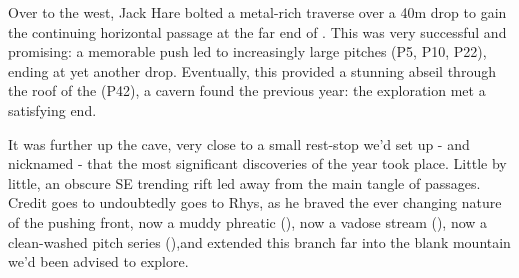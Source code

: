 Over to the west, Jack Hare bolted a metal-rich traverse over a 40m drop to gain the continuing horizontal passage at the far end of . This was very successful and promising: a memorable push led to increasingly large pitches (P5, P10, P22), ending at yet another drop. Eventually, this provided a stunning abseil through the roof of the  (P42), a cavern found the previous year: the exploration met a satisfying end.

It was further up the cave, very close to a small rest-stop we'd set up - and nicknamed  - that the most significant discoveries of the year took place. Little by little, an obscure SE trending rift led away from the main tangle of passages. Credit goes to undoubtedly goes to Rhys, as he braved the ever changing nature of the pushing front, now a muddy phreatic (), now a vadose stream (), now a clean-washed pitch series (),and extended this branch far into the blank mountain we'd been advised to explore.  

